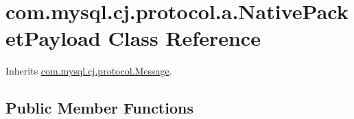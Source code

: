 \hypertarget{classcom_1_1mysql_1_1cj_1_1protocol_1_1a_1_1_native_packet_payload}{}\section{com.\+mysql.\+cj.\+protocol.\+a.\+Native\+Packet\+Payload Class Reference}
\label{classcom_1_1mysql_1_1cj_1_1protocol_1_1a_1_1_native_packet_payload}


Inherits \mbox{\hyperlink{interfacecom_1_1mysql_1_1cj_1_1protocol_1_1_message}{com.\+mysql.\+cj.\+protocol.\+Message}}.

\subsection*{Public Member Functions}

